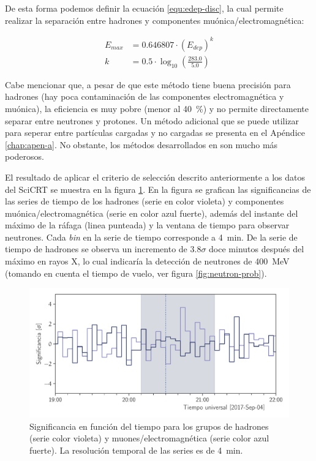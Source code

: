 De esta forma podemos definir la ecuación \ref{equ:edep-disc}, la cual permite realizar la separación entre hadrones y componentes muónica/electromagnética:

\begin{align}
\label{equ:edep-disc}
E_{max} &=0.646807\cdot (E_{dep})^{k}\\
k &=0.5\cdot\log_{10}\left(\frac{283.0}{5.0}\right) \nonumber
\end{align}

Cabe mencionar que, a pesar de que este método tiene buena precisión para hadrones (hay poca contaminación de las componentes electromagnética y muónica), la eficiencia es muy pobre (menor al \SI{40}{\percent}) y no permite directamente separar entre neutrones y protones. Un método adicional que se puede utilizar para seperar entre partículas cargadas y no cargadas se presenta en el Apéndice \ref{chap:apen-a}. No obstante, los métodos desarrollados en \cite{garcia20} son mucho más poderosos.

El resultado de aplicar el criterio de selección descrito anteriormente a los datos del SciCRT se muestra en la figura \ref{fig:september-04-disc}. En la figura se grafican las significancias de las series de tiempo de los hadrones (serie en color violeta) y componentes muónica/electromagnética (serie en color azul fuerte), además del instante del máximo de la ráfaga (linea punteada) y la ventana de tiempo para observar neutrones. Cada \emph{bin} en la serie de tiempo corresponde a \SI{4}{\minute}. De la serie de tiempo de hadrones se observa un incremento de $3.8\sigma$ doce minutos después del máximo en rayos X, lo cual indicaría la detección de neutrones de \SI{400}{\mega\electronvolt} (tomando en cuenta el tiempo de vuelo, ver figura \ref{fig:neutron-prob}).

\begin{figure}
        \centering
        \includegraphics[width=\textwidth]{significance-170904.pdf}
        \caption{Significancia en función del tiempo para los grupos de hadrones (serie color violeta) y muones/electromagnética (serie color azul fuerte). La resolución temporal de las series es de \SI{4}{\minute}.}
        \label{fig:september-04-disc}
\end{figure}

